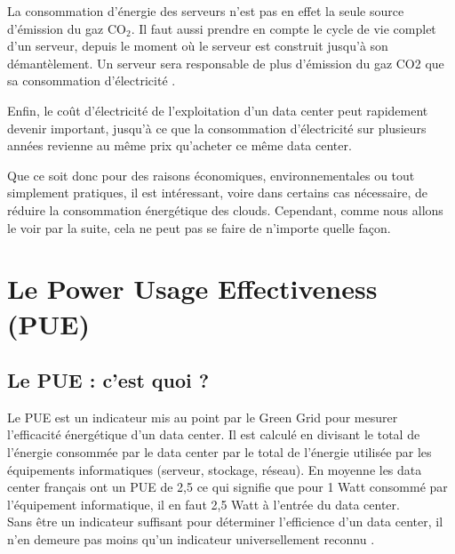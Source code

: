 \begin{onehalfspace}
La consommation d’énergie des serveurs n’est pas en effet la seule source d’émission du gaz CO$_{2}$. Il faut aussi prendre en compte le cycle de vie complet d’un serveur, depuis le moment où le serveur est construit jusqu’à son démantèlement. Un serveur sera responsable de plus d’émission du gaz CO2  que sa consommation d’électricité \cite{WEB46}.\medskip 

Enfin, le coût d'électricité de l'exploitation d'un data center peut rapidement devenir important, jusqu’à ce que la consommation d'électricité sur plusieurs années revienne au même prix qu'acheter ce même data center.\medskip 

Que ce soit donc pour des raisons économiques, environnementales ou tout simplement pratiques,
il est intéressant, voire dans certains cas nécessaire, de réduire la consommation énergétique des clouds. Cependant, comme nous allons le voir par la suite, cela ne peut pas se faire de
n'importe quelle façon.
\end{onehalfspace}
\section{Le Power Usage Effectiveness (PUE)}
\subsection{Le PUE : c'est quoi ?}
\begin{onehalfspace}
Le PUE est un indicateur mis au point par le Green Grid pour mesurer l'efficacité énergétique d'un data center. Il est calculé en divisant le total de l'énergie consommée par le data center par le total de l'énergie utilisée par les équipements informatiques (serveur, stockage, réseau). En moyenne les data center français ont un PUE de 2,5 ce qui signifie que pour 1 Watt consommé par l'équipement informatique, il en faut 2,5 Watt à l'entrée du data center. \\
Sans être un indicateur suffisant pour déterminer l'efficience d'un data center, il n'en demeure pas moins qu'un indicateur universellement reconnu \cite{WEB7}.
\end{onehalfspace}

